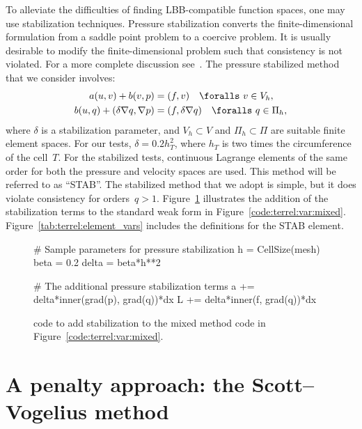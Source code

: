 To alleviate the difficulties of finding LBB-compatible function
spaces, one may use stabilization techniques.  Pressure stabilization
converts the finite-dimensional formulation from a saddle point
problem to a coercive problem. It is usually desirable to modify the
finite-dimensional problem such that consistency is not violated. For
a more complete discussion see~\citet{DoneaHuerta2003}.  The pressure
stabilized method that we consider involves:
%
\begin{align}
  a(u, v) + b(v, p)
      &=  (f, v) \quad \foralls \ v \in V_{h},
\\
  b(u, q) +  (\delta\nabla{q},\nabla{p}) &=   (f, \delta \nabla q)
\quad \foralls \ q \in \Pi_{h},
\end{align}
%
where $\delta$ is a stabilization parameter, and $V_{h} \subset V$ and
$\Pi_{h} \subset \Pi$ are suitable finite element spaces. For our tests,
$\delta = 0.2 h_{T}^{2}$, where $h_{T}$ is two times the circumference
of the cell~$T$.  For the stabilized tests, continuous Lagrange
elements of the same order for both the pressure and velocity spaces
are used. This method will be referred to as ``STAB''. The stabilized
method that we adopt is simple, but it does violate consistency
for orders~$q > 1$.  Figure~\ref{code:terrel:var:stab} illustrates
the addition of the stabilization terms to the standard weak form in
Figure~\ref{code:terrel:var:mixed}.  Figure~\ref{tab:terrel:element_vars}
includes the definitions for the STAB element.

\begin{figure}
\begin{python}
# Sample parameters for pressure stabilization
h = CellSize(mesh)
beta = 0.2
delta = beta*h**2

# The additional pressure stabilization terms
a += delta*inner(grad(p), grad(q))*dx
L += delta*inner(f, grad(q))*dx
\end{python}
\caption{\ufl{} code to add stabilization to the mixed method
code in Figure~\ref{code:terrel:var:mixed}.}
\label{code:terrel:var:stab}
\end{figure}
\section{A penalty approach: the Scott--Vogelius method}

